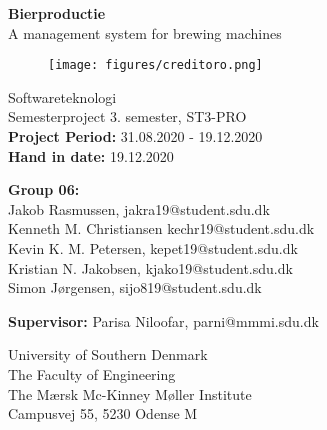 \begin{titlepage}
\begin{center}
{ \LARGE \bfseries Bierproductie \\[0.4cm]}
A management system for brewing machines
\begin{figure}[H]
\centering 
\texttt{[image: figures/creditoro.png]}
\label{figure:creditoro_system}
\end{figure}

Softwareteknologi\\
\vspace{2mm}
Semesterproject 3. semester, ST3-PRO\\
\vspace{2mm}
\textbf{Project Period:} 31.08.2020 - 19.12.2020 \\
\vspace{2mm}
\textbf{Hand in date:} 19.12.2020 \\

\vspace{7mm}

\textbf{Group 06:} \\
\vspace{2mm}
Jakob Rasmussen, jakra19@student.sdu.dk \\
\vspace{2mm}
Kenneth M. Christiansen kechr19@student.sdu.dk \\
\vspace{2mm}
Kevin K. M. Petersen, kepet19@student.sdu.dk \\
\vspace{2mm}
Kristian N. Jakobsen, kjako19@student.sdu.dk \\
\vspace{2mm}
Simon Jørgensen, sijo819@student.sdu.dk \\

\vspace{7mm}

\textbf{Supervisor:} Parisa Niloofar, parni@mmmi.sdu.dk \\

\vfill

University of Southern Denmark \\
The Faculty of Engineering \\
The Mærsk Mc-Kinney Møller Institute \\
Campusvej 55, 5230 Odense M 

\end{center}
\end{titlepage}